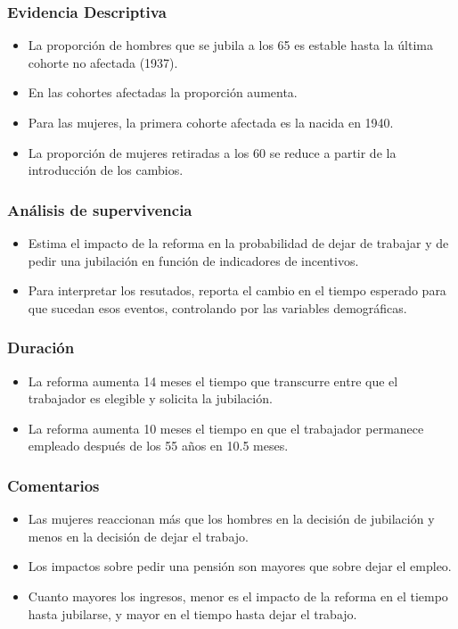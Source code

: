 \documentclass{beamer}
\begin{document}
  \frame
  {
    \frametitle{Evidencia Descriptiva}
      
      \begin{itemize}
        \item La proporción de hombres que se jubila a los 65 es estable hasta la última cohorte no afectada (1937).
        \item En las cohortes afectadas la proporción aumenta.
        \item Para las mujeres, la primera cohorte afectada es la nacida en 1940.
        \item La proporción de mujeres retiradas a los 60 se reduce a partir de la introducción de los cambios.
      \end{itemize}
  }
  \frame
  {
    \frametitle{Análisis de supervivencia}
    \begin{itemize}
    \item Estima el impacto de la reforma en la probabilidad de dejar de trabajar y de pedir una jubilación en función de indicadores de incentivos.
    \item Para interpretar los resutados, reporta el cambio en el tiempo esperado para que sucedan esos eventos, controlando por las variables demográficas.
    \end{itemize}
  }
  \frame
  {
  \frametitle{Duración}
     \begin{itemize}
       \item La reforma aumenta 14 meses el tiempo que transcurre entre que el trabajador es elegible y solicita la jubilación.
       \item La reforma aumenta 10 meses el tiempo en que el trabajador permanece empleado después de los 55 años en 10.5 meses.
     \end{itemize}
  }
  \frame
  {
  \frametitle{Comentarios}
    \begin{itemize}
      \item Las mujeres reaccionan más que los hombres en la decisión de jubilación y menos en la decisión de dejar el trabajo.
      \item Los impactos sobre pedir una pensión son mayores que sobre dejar el empleo.
      \item Cuanto mayores los ingresos, menor es el impacto de la reforma en el tiempo hasta jubilarse, y mayor en el tiempo hasta dejar el trabajo.
    \end{itemize}

}
\end{document}
